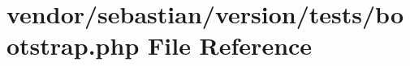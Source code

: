 \section{vendor/sebastian/version/tests/bootstrap.php File Reference}
\label{sebastian_2version_2tests_2bootstrap_8php}
